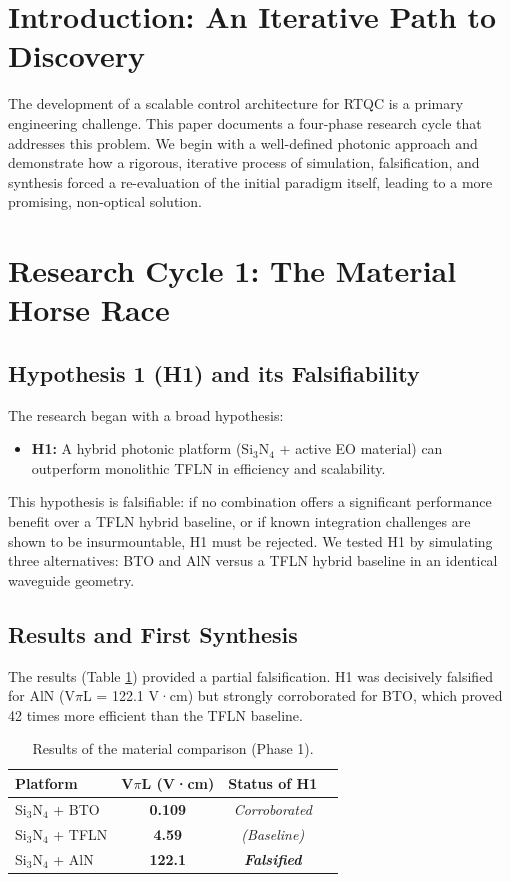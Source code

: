 \documentclass[conference]{IEEEtran} %
\begin{document}
\section{Introduction: An Iterative Path to Discovery}
The development of a scalable control architecture for RTQC is a primary engineering challenge. This paper documents a four-phase research cycle that addresses this problem. We begin with a well-defined photonic approach and demonstrate how a rigorous, iterative process of simulation, falsification, and synthesis forced a re-evaluation of the initial paradigm itself, leading to a more promising, non-optical solution.

\section{Research Cycle 1: The Material Horse Race}
\subsection{Hypothesis 1 (H1) and its Falsifiability}
The research began with a broad hypothesis:
\begin{itemize}
    \item \textbf{H1:} A hybrid photonic platform (Si$_3$N$_4$ + active EO material) can outperform monolithic TFLN in efficiency and scalability.
\end{itemize}
This hypothesis is falsifiable: if no combination offers a significant performance benefit over a TFLN hybrid baseline, or if known integration challenges are shown to be insurmountable, H1 must be rejected. We tested H1 by simulating three alternatives: BTO and AlN versus a TFLN hybrid baseline in an identical waveguide geometry.

\subsection{Results and First Synthesis}
The results (Table \ref{tab:cycle1}) provided a partial falsification. H1 was decisively falsified for AlN (V$\pi$L = 122.1 V·cm) but strongly corroborated for BTO, which proved 42 times more efficient than the TFLN baseline.

\begin{table}[H]
\caption{Results of the material comparison (Phase 1).}
\label{tab:cycle1}
\centering
\begin{tabular}{lccc}
\toprule
\textbf{Platform} & \textbf{V$\pi$L (V·cm)} & \textbf{Status of H1} \\
\midrule
Si$_3$N$_4$ + BTO & \textbf{0.109} & \textit{Corroborated} \\
Si$_3$N$_4$ + TFLN & \textbf{4.59} & \textit{(Baseline)} \\
Si$_3$N$_4$ + AlN & \textbf{122.1} & \textbf{\textit{Falsified}} \\
\bottomrule
\end{tabular}
\end{table}
\end{document}
